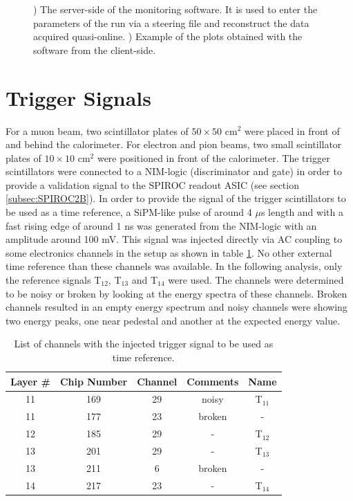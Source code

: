 \begin{figure}[htbp!]
\begin{subfigure}[t]{0.5\textwidth}
		\caption{} \label{fig:QtReco_Client}
	\end{subfigure}
	\caption{) The server-side of the monitoring software. It is used to enter the parameters of the run via a steering file and reconstruct the data acquired quasi-online. ) Example of the plots obtained with the software from the client-side.}
\end{figure}

\section{Trigger Signals}
\label{subsec:trigger}

For a muon beam, two scintillator plates of $50\times50$ cm$^2$ were placed in front of and behind the calorimeter. For electron and pion beams, two small scintillator plates of $10\times10$ cm$^2$ were positioned in front of the calorimeter. The trigger scintillators were connected to a NIM-logic (discriminator and gate) in order to provide a validation signal to the SPIROC readout ASIC (see section \ref{subsec:SPIROC2B}).
In order to provide the signal of the trigger scintillators to be used as a time reference, a SiPM-like pulse of around 4 $\mu$s length and with a fast rising edge of around 1 ns was generated from the NIM-logic with an amplitude around 100 mV. This signal was injected directly via AC coupling to some electronics channels in the setup as shown in table \ref{table:trigger_signal_list}. No other external time reference than these channels was available. In the following analysis, only the reference signals T$_{12}$,  T$_{13}$ and T$_{14}$ were used. The channels were determined to be noisy or broken by looking at the energy spectra of these channels. Broken channels resulted in an empty energy spectrum and noisy channels were showing two energy peaks, one near pedestal and another at the expected energy value.

\begin{table}[htb!]
	\centering
	\caption{List of channels with the injected trigger signal to be used as time reference.}
	\label{table:trigger_signal_list}
	\begin{tabular}{@{} ccccc @{}}
		\hline
		Layer \# & Chip Number & Channel & Comments & Name \\
		\hline
		11 & 169 & 29 & noisy & T$_{11}$ \\
		11 & 177 & 23 & broken & - \\
		12 & 185 & 29 & - & T$_{12}$ \\
		13 & 201 & 29 & -  & T$_{13}$ \\
		13 & 211 & 6 & broken & - \\
		14 & 217 & 23 & - & T$_{14}$ \\
		\hline
	\end{tabular}
\end{table}

